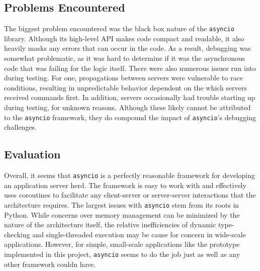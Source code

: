 \subsection{Problems Encountered}
The biggest problem encountered was the black box nature of the \texttt{asyncio}
library. Although its high-level API makes code compact and readable, it also
heavily masks any errors that can occur in the code. As a result, debugging was
somewhat problematic, as it was hard to determine if it was the asynchronous
code that was failing for the logic itself. There were also numerous issues run
into during testing. For one, propagations between servers were vulnerable to
race conditions, resulting in unpredictable behavior dependent on the which
servers received commands first. In addition, servers occasionally had trouble
starting up during testing, for unknown reasons. Although these likely cannot
be attributed to the \texttt{asyncio} framework, they do compound the impact
of \texttt{asyncio}'s debugging challenges.

\subsection{Evaluation}
Overall, it seems that \texttt{asyncio} is a perfectly reasonable framework
for developing an application server herd. The framework is easy to work with
and effectively uses coroutines to facilitate any client-server or server-server
interactions that the architecture requires. The largest issues with 
\texttt{asyncio} stem from its roots in Python. While concerns over memory
management can be minimized by the nature of the architecture itself, the
relative inefficiencies of dynamic type-checking and single-threaded execution
may be cause for concern in wide-scale applications. However, for simple,
small-scale applications like the prototype implemented in this project,
\texttt{asyncio} seems to do the job just as well as any other framework couldn
have.

